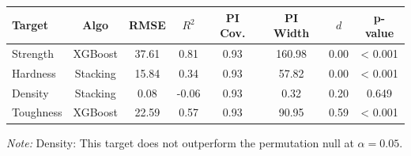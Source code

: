 \begin{tabular}{lccccccc}
\toprule
Target & Algo & RMSE & $R^2$ & PI Cov. & PI Width & $d$ & p-value \\
\midrule
Strength & XGBoost & 37.61 & 0.81 & 0.93 & 160.98 & 0.00 & < 0.001 \\
Hardness & Stacking & 15.84 & 0.34 & 0.93 & 57.82 & 0.00 & < 0.001 \\
Density & Stacking & 0.08 & -0.06 & 0.93 & 0.32 & 0.20 & 0.649 \\
Toughness & XGBoost & 22.59 & 0.57 & 0.93 & 90.95 & 0.59 & < 0.001 \\
\bottomrule
\end{tabular}
\newline\textit{Note:} Density: This target does not outperform the permutation null at $\alpha=0.05$.
